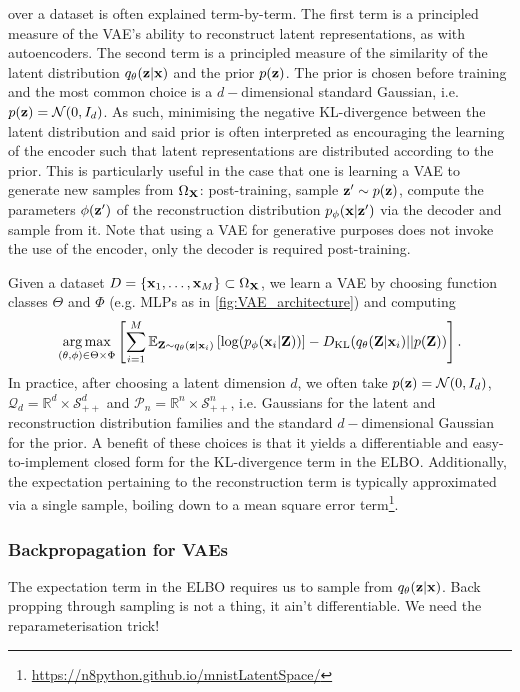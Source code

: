 \documentclass[11pt]{article}
\begin{document}
over a dataset is often explained term-by-term. The first term is a principled measure of the VAE's ability to reconstruct latent representations, as with autoencoders. The second term is a principled measure of the similarity of the latent distribution $q_{\theta}(\mathbf{z}|\mathbf{x})$ and the prior $p(\mathbf{z})$. The prior is chosen before training and the most common choice is a $d-$dimensional standard Gaussian, i.e. $p(\mathbf{z})=\mathcal{N}(0,I_d)$. As such, minimising the negative KL-divergence between the latent distribution and said prior is often interpreted as encouraging the learning of the encoder such that latent representations are distributed according to the prior. This is particularly useful in the case that one is learning a VAE to generate new samples from $\Omega_{\mathbf{X}}$: post-training, sample $\mathbf{z}'\sim p(\mathbf{z})$, compute the parameters $\phi(\mathbf{z}')$ of the reconstruction distribution $p_{\phi}(\mathbf{x}|\mathbf{z}')$ via the decoder and sample from it. Note that using a VAE for generative purposes does not invoke the use of the encoder, only the decoder is required post-training.

Given a dataset $D=\{\mathbf{x}_1,\dots,\mathbf{x}_M\}\subset\Omega_{\mathbf{X}}$, we learn a VAE by choosing function classes $\Theta$ and $\Phi$ (e.g. MLPs as in \autoref{fig:VAE_architecture}) and computing
$$
\operatorname*{arg\,max}_{(\theta,\phi)\in\Theta\times\Phi}
\left[
\sum_{i=1}^M
\mathbb{E}_{\mathbf{Z}\sim q_{\theta}(\mathbf{z}|\mathbf{x}_i)}\left[\log(p_{\phi}(\mathbf{x}_i|\mathbf{Z}))\right]-D_{\text{KL}}(q_{\theta}(\mathbf{Z}|\mathbf{x}_i)||p(\mathbf{Z}))
\right].
$$
In practice, after choosing a latent dimension $d$, we often take $p(\mathbf{z})=\mathcal{N}(0,I_d)$, $\mathcal{Q}_d=\mathbb{R}^d\times\mathcal{S}_{++}^d$ and $\mathcal{P}_n=\mathbb{R}^n\times\mathcal{S}_{++}^n$, i.e. Gaussians for the latent and reconstruction distribution families and the standard $d-$dimensional Gaussian for the prior. A benefit of these choices is that it yields a differentiable and easy-to-implement closed form for the KL-divergence term in the ELBO. Additionally, the expectation pertaining to the reconstruction term is typically approximated via a single sample, boiling down to a mean square error term\footnote{\url{https://n8python.github.io/mnistLatentSpace/}}.

\subsubsection{Backpropagation for VAEs}
\TODO{} The expectation term in the ELBO requires us to sample from $q_{\theta}(\mathbf{z}|\mathbf{x})$. Back propping through sampling is not a thing, it ain't differentiable. We need the reparameterisation trick!
\end{document}
